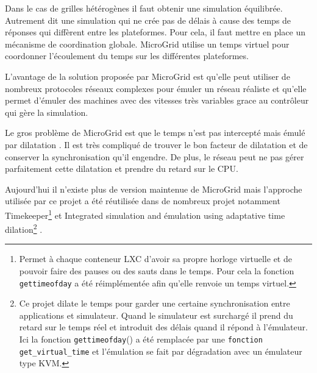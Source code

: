 Dans le cas de grilles hétérogènes il faut obtenir une simulation équilibrée. Autrement dit une simulation qui ne crée pas de délais à cause des temps de réponses qui diffèrent entre les plateformes. Pour cela, il faut mettre en place un mécanisme de coordination globale. MicroGrid utilise un temps virtuel pour coordonner l'écoulement du temps sur les différentes plateformes.

L'avantage de la solution proposée par MicroGrid est qu'elle peut utiliser de nombreux protocoles réseaux complexes pour émuler un réseau réaliste et qu'elle permet d'émuler des machines avec des vitesses très variables grace au contrôleur qui gère la simulation.

Le gros problème de MicroGrid est que le temps n'est pas intercepté mais émulé par dilatation \citep{MICROGRID_lee2014integrated}. Il est très compliqué de trouver le bon facteur de dilatation et de conserver la synchronisation qu'il engendre. De plus, le réseau peut ne pas gérer parfaitement cette dilatation et prendre du retard sur le CPU.

Aujourd'hui il n'existe plus de version maintenue de MicroGrid mais l'approche utilisée par ce projet a été réutilisée dans de nombreux projet notamment Timekeeper\footnote{Permet à chaque conteneur LXC d'avoir sa propre horloge virtuelle et de pouvoir faire des pauses ou des sauts dans le temps. Pour cela la fonction \texttt{gettimeofday} a été réimplémentée afin qu'elle renvoie un temps virtuel.} \citep{MICROGRID_lamps2014timekeeper} et Integrated simulation and émulation using adaptative time dilation\footnote{Ce projet  dilate le temps pour garder une certaine synchronisation entre applications et simulateur. Quand le simulateur est surchargé il prend du retard sur le temps réel et introduit des délais quand il répond à l'émulateur. Ici la fonction \texttt{gettimeofday}() a été remplacée par une \texttt{fonction get\_virtual\_time} et l'émulation se fait par dégradation avec un émulateur type KVM.} \citep{MICROGRID_lee2014integrated}.
